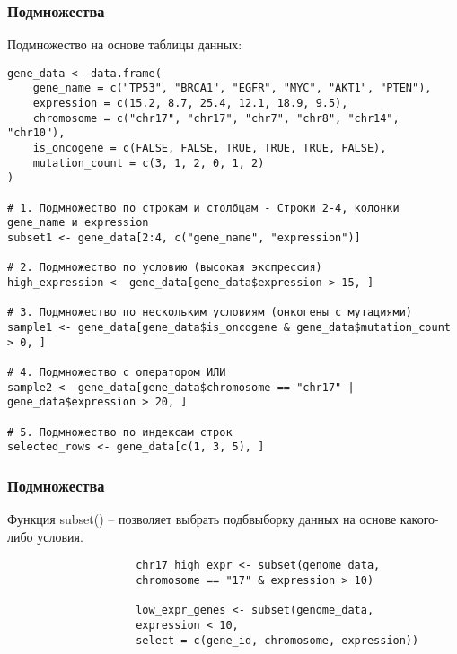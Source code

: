 \documentclass[14pt,a4paper]{beamer}
\begin{document}
	\begin{frame}[fragile]
		\frametitle{Подмножества}
		Подмножество на основе таблицы данных:
		{\fontsize{7}{7}\selectfont
				\begin{verbatim}
gene_data <- data.frame(
    gene_name = c("TP53", "BRCA1", "EGFR", "MYC", "AKT1", "PTEN"),
    expression = c(15.2, 8.7, 25.4, 12.1, 18.9, 9.5),
    chromosome = c("chr17", "chr17", "chr7", "chr8", "chr14", "chr10"),
    is_oncogene = c(FALSE, FALSE, TRUE, TRUE, TRUE, FALSE),
    mutation_count = c(3, 1, 2, 0, 1, 2)
)
					
# 1. Подмножество по строкам и столбцам - Строки 2-4, колонки gene_name и expression
subset1 <- gene_data[2:4, c("gene_name", "expression")]
					
# 2. Подмножество по условию (высокая экспрессия)
high_expression <- gene_data[gene_data$expression > 15, ]
					
# 3. Подмножество по нескольким условиям (онкогены с мутациями)
sample1 <- gene_data[gene_data$is_oncogene & gene_data$mutation_count > 0, ]
					
# 4. Подмножество с оператором ИЛИ
sample2 <- gene_data[gene_data$chromosome == "chr17" | gene_data$expression > 20, ]
					
# 5. Подмножество по индексам строк
selected_rows <- gene_data[c(1, 3, 5), ]   \end{verbatim}
		}
		
		
	\end{frame}
	
	\begin{frame}[fragile]
		\frametitle{Подмножества}
		Функция subset() – позволяет выбрать подбвыборку данных на основе какого-либо условия.
		{\fontsize{8}{9}\selectfont
			
				\begin{verbatim}
					chr17_high_expr <- subset(genome_data, 
					chromosome == "17" & expression > 10)
					
					low_expr_genes <- subset(genome_data, 
					expression < 10, 
					select = c(gene_id, chromosome, expression))\end{verbatim}
			
		}
		
		
	\end{frame}
	
\end{document}

